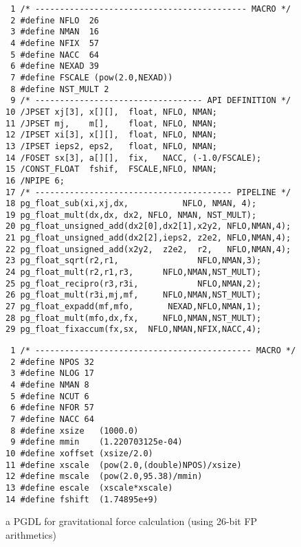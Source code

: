 \documentclass{llncs}
\begin{document}
\begin{figure}[htb]
  \begin{center}
    \begin{minipage}{.45\linewidth}
\scriptsize
{\tiny
\begin{verbatim}
 1 /* ------------------------------------------- MACRO */
 2 #define NFLO  26
 3 #define NMAN  16
 4 #define NFIX  57
 5 #define NACC  64
 6 #define NEXAD 39
 7 #define FSCALE (pow(2.0,NEXAD))
 8 #define NST_MULT 2
 9 /* ---------------------------------- API DEFINITION */
10 /JPSET xj[3], x[][],  float, NFLO, NMAN;
11 /JPSET mj,    m[],    float, NFLO, NMAN;
12 /IPSET xi[3], x[][],  float, NFLO, NMAN;
13 /IPSET ieps2, eps2,   float, NFLO, NMAN;
14 /FOSET sx[3], a[][],  fix,   NACC, (-1.0/FSCALE);
15 /CONST_FLOAT  fshif,  FSCALE,NFLO, NMAN;
16 /NPIPE 6;
17 /* ---------------------------------------- PIPELINE */
18 pg_float_sub(xi,xj,dx,           NFLO, NMAN, 4);
19 pg_float_mult(dx,dx, dx2, NFLO, NMAN, NST_MULT);
20 pg_float_unsigned_add(dx2[0],dx2[1],x2y2, NFLO,NMAN,4);
21 pg_float_unsigned_add(dx2[2],ieps2, z2e2, NFLO,NMAN,4);
22 pg_float_unsigned_add(x2y2,  z2e2,  r2,   NFLO,NMAN,4);
23 pg_float_sqrt(r2,r1,                NFLO,NMAN,3);
24 pg_float_mult(r2,r1,r3,      NFLO,NMAN,NST_MULT);
25 pg_float_recipro(r3,r3i,            NFLO,NMAN,2);
26 pg_float_mult(r3i,mj,mf,     NFLO,NMAN,NST_MULT);
27 pg_float_expadd(mf,mfo,       NEXAD,NFLO,NMAN,1);
28 pg_float_mult(mfo,dx,fx,     NFLO,NMAN,NST_MULT);
29 pg_float_fixaccum(fx,sx,  NFLO,NMAN,NFIX,NACC,4);
\end{verbatim}
}
\caption{a PGDL for gravitational force calculation (using 26-bit FP arithmetics)}
\label{figgravfloat_pgdl}
    \end{minipage}
    \hspace{2.3pc}
    \begin{minipage}{.45\linewidth}
\scriptsize
{\tiny
\begin{verbatim}
 1 /* -------------------------------------------- MACRO */
 2 #define NPOS 32
 3 #define NLOG 17
 4 #define NMAN 8
 5 #define NCUT 6
 6 #define NFOR 57
 7 #define NACC 64
 8 #define xsize   (1000.0)
 9 #define mmin    (1.220703125e-04)
10 #define xoffset (xsize/2.0)
11 #define xscale  (pow(2.0,(double)NPOS)/xsize)
12 #define mscale  (pow(2.0,95.38)/mmin)
13 #define escale  (xscale*xscale)
14 #define fshift  (1.74895e+9)

\end{verbatim}}
\end{minipage}
\end{center}
\end{figure}
\end{document}
